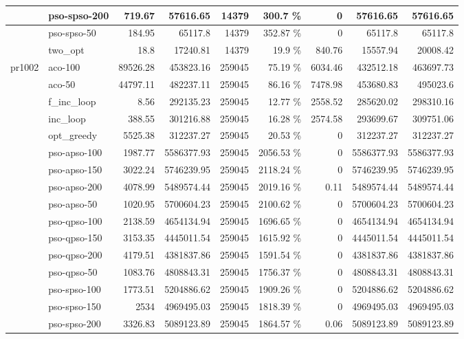 \documentclass[conference]{IEEEtran}
\begin{document}
\begin{center}
\begin{longtable}[ht]{|l|l|r|r|r|r|r|r|r|}
 & pso-spso-200 & 719.67 & 57616.65 & 14379 & 300.7 \% & 0 & 57616.65 & 57616.65 \\ \hline
 & pso-spso-50 & 184.95 & 65117.8 & 14379 & 352.87 \% & 0 & 65117.8 & 65117.8 \\ \hline
 & two\_opt & 18.8 & 17240.81 & 14379 & 19.9 \% & 840.76 & 15557.94 & 20008.42 \\ \hline
pr1002 & aco-100 & 89526.28 & 453823.16 & 259045 & 75.19 \% & 6034.46 & 432512.18 & 463697.73 \\ \hline
 & aco-50 & 44797.11 & 482237.11 & 259045 & 86.16 \% & 7478.98 & 453680.83 & 495023.6 \\ \hline
 & f\_inc\_loop & 8.56 & 292135.23 & 259045 & 12.77 \% & 2558.52 & 285620.02 & 298310.16 \\ \hline
 & inc\_loop & 388.55 & 301216.88 & 259045 & 16.28 \% & 2574.58 & 293699.67 & 309751.06 \\ \hline
 & opt\_greedy & 5525.38 & 312237.27 & 259045 & 20.53 \% & 0 & 312237.27 & 312237.27 \\ \hline
 & pso-apso-100 & 1987.77 & 5586377.93 & 259045 & 2056.53 \% & 0 & 5586377.93 & 5586377.93 \\ \hline
 & pso-apso-150 & 3022.24 & 5746239.95 & 259045 & 2118.24 \% & 0 & 5746239.95 & 5746239.95 \\ \hline
 & pso-apso-200 & 4078.99 & 5489574.44 & 259045 & 2019.16 \% & 0.11 & 5489574.44 & 5489574.44 \\ \hline
 & pso-apso-50 & 1020.95 & 5700604.23 & 259045 & 2100.62 \% & 0 & 5700604.23 & 5700604.23 \\ \hline
 & pso-qpso-100 & 2138.59 & 4654134.94 & 259045 & 1696.65 \% & 0 & 4654134.94 & 4654134.94 \\ \hline
 & pso-qpso-150 & 3153.35 & 4445011.54 & 259045 & 1615.92 \% & 0 & 4445011.54 & 4445011.54 \\ \hline
 & pso-qpso-200 & 4179.51 & 4381837.86 & 259045 & 1591.54 \% & 0 & 4381837.86 & 4381837.86 \\ \hline
 & pso-qpso-50 & 1083.76 & 4808843.31 & 259045 & 1756.37 \% & 0 & 4808843.31 & 4808843.31 \\ \hline
 & pso-spso-100 & 1773.51 & 5204886.62 & 259045 & 1909.26 \% & 0 & 5204886.62 & 5204886.62 \\ \hline
 & pso-spso-150 & 2534 & 4969495.03 & 259045 & 1818.39 \% & 0 & 4969495.03 & 4969495.03 \\ \hline
 & pso-spso-200 & 3326.83 & 5089123.89 & 259045 & 1864.57 \% & 0.06 & 5089123.89 & 5089123.89 \\ \hline

\end{longtable}
\end{center}
\end{document}

